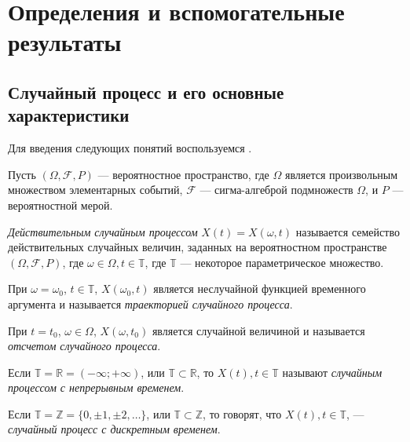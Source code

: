
\newpage
\chapter{Определения и вспомогательные результаты}
\label{c:definitions}

\section{Случайный процесс и его основные характеристики}

Для введения следующих понятий воспользуемся \cite{brillinjer-ts, trush-ts}.

Пусть $ (\Omega, \mathcal{F}, P) $ --- вероятностное пространство, где $\Omega$ является произвольным множеством элементарных событий, $\mathcal{F}$ --- сигма-алгеброй подмножеств $\Omega$, и $P$ --- вероятностной мерой.

\begin{Definition}
\label{def:stochastic-process}
	\textit{Действительным случайным процессом} $ X(t) = X(\omega, t) $ называется семейство действительных случайных величин, заданных на вероятностном пространстве $ (\Omega, \mathcal{F}, P) $, где $ \omega \in \Omega, t \in \mathbb{T}$, где $ \mathbb{T} $ --- некоторое параметрическое множество.

	При $ \omega = \omega_{0} $, $ t \in \mathbb{T} $, $ X(\omega_{0}, t) $ является неслучайной функцией временного аргумента и называется \textit{траекторией случайного процесса}.

	При $ t = t_{0} $, $ \omega \in \Omega $, $ X(\omega, t_{0}) $ является случайной величиной и называется \textit{отсчетом случайного процесса}.
\end{Definition}

\begin{Definition}%
    Если $ \mathbb{T} = \mathbb{R} = (- \infty; + \infty) $, или $ \mathbb{T} \subset \mathbb{R}$, то $ X(t), t \in \mathbb{T} $ называют \textit{случайным процессом с непрерывным временем}.
\end{Definition}

\begin{Definition}
	Если $ \mathbb{T} = \mathbb{Z} = \{ 0, \pm 1, \pm 2, \dots \} $, или $ \mathbb{T} \subset \mathbb{Z} $, то говорят, что $ X(t), t \in \mathbb{T} $, --- \textit{случайный процесс с дискретным временем}.
\end{Definition}

